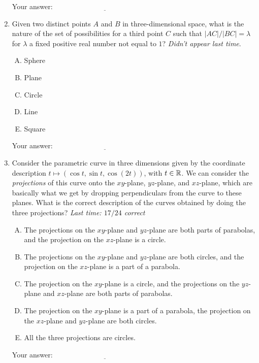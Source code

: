 \documentclass[10pt]{amsart}
\begin{document}
\begin{enumerate}
  \vspace{0.1in}
  Your answer: $\underline{\qquad\qquad\qquad\qquad\qquad\qquad\qquad}$
  \vspace{0.1in}

\item Given two distinct points $A$ and $B$ in three-dimensional
  space, what is the nature of the set of possibilities for a third
  point $C$ such that $|AC|/|BC| = \lambda$ for $\lambda$ a fixed
  positive real number not equal to $1$? {\em Didn't appear last time}.

  \begin{enumerate}[(A)]
  \item Sphere
  \item Plane
  \item Circle
  \item Line
  \item Square
  \end{enumerate}

  \vspace{0.1in}
  Your answer: $\underline{\qquad\qquad\qquad\qquad\qquad\qquad\qquad}$
  \vspace{0.1in}

\item Consider the parametric curve in three dimensions given by the
  coordinate description $t \mapsto (\cos t, \sin t, \cos(2t))$, with
  $t \in \mathbb{R}$. We can consider the {\em projections} of this curve onto
  the $xy$-plane, $yz$-plane, and $xz$-plane, which are basically what
  we get by dropping perpendiculars from the curve to these
  planes. What is the correct description of the curves obtained by
  doing the three projections? {\em Last time: $17/24$ correct}

  \begin{enumerate}[(A)]
  \item The projections on the $xy$-plane and $yz$-plane are both parts
    of parabolas, and the projection on the $xz$-plane is a circle.
  \item The projections on the $xy$-plane and $yz$-plane are both
    circles, and the projection on the $xz$-plane is a part of a
    parabola.
  \item The projection on the $xy$-plane is a circle, and the
    projections on the $yz$-plane and $xz$-plane are both parts of
    parabolas.
  \item The projection on the $xy$-plane is a part of a parabola, the
    projection on the $xz$-plane and $yz$-plane are both circles.
  \item All the three projections are circles.
  \end{enumerate}

  \vspace{0.1in}
  Your answer: $\underline{\qquad\qquad\qquad\qquad\qquad\qquad\qquad}$
  \vspace{0.1in}

\end{enumerate}
\end{document}
